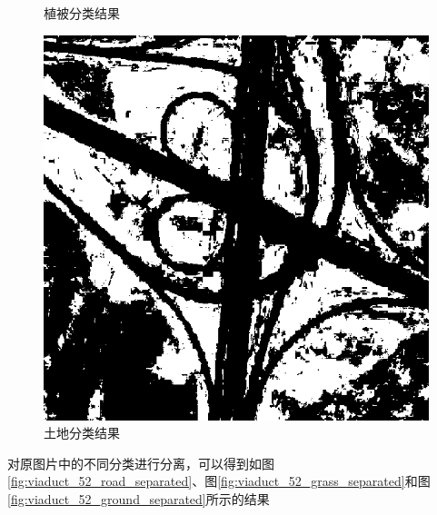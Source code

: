 \begin{figure}[H]
\begin{minipage}{0.3\linewidth}
		\caption{植被分类结果}
		\label{fig:viaduct_52_grass_logic}
	\end{minipage}
	\begin{minipage}{0.3\linewidth}
		\includegraphics[width=\linewidth]{figure/viaduct_52_Ground_Logic_P.png}
		\caption{土地分类结果}
		\label{fig:viaduct_52_ground_logic}
	\end{minipage}
\end{figure}
对原图片中的不同分类进行分离，可以得到如图\ref{fig:viaduct_52_road_separated}、图\ref{fig:viaduct_52_grass_separated}和图\ref{fig:viaduct_52_ground_separated}所示的结果
